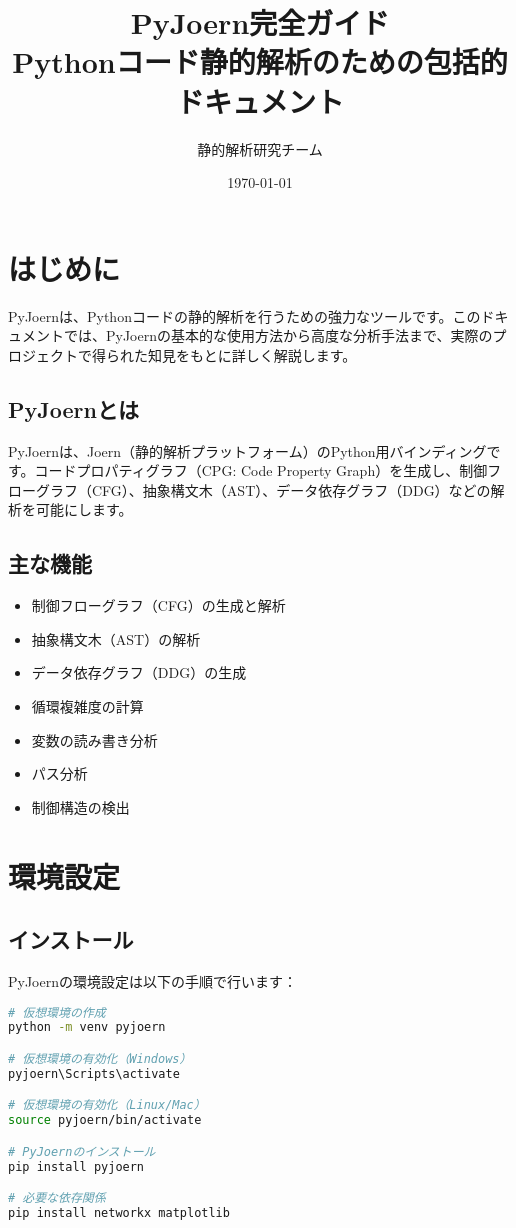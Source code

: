 \documentclass[12pt,a4paper]{article}
\title{\textbf{PyJoern完全ガイド}\\
\large Pythonコード静的解析のための包括的ドキュメント}
\author{静的解析研究チーム}
\date{\today}
\begin{document}
\maketitle
\tableofcontents
\newpage

\section{はじめに}

PyJoernは、Pythonコードの静的解析を行うための強力なツールです。このドキュメントでは、PyJoernの基本的な使用方法から高度な分析手法まで、実際のプロジェクトで得られた知見をもとに詳しく解説します。

\subsection{PyJoernとは}

PyJoernは、Joern（静的解析プラットフォーム）のPython用バインディングです。コードプロパティグラフ（CPG: Code Property Graph）を生成し、制御フローグラフ（CFG）、抽象構文木（AST）、データ依存グラフ（DDG）などの解析を可能にします。

\subsection{主な機能}

\begin{itemize}
    \item 制御フローグラフ（CFG）の生成と解析
    \item 抽象構文木（AST）の解析
    \item データ依存グラフ（DDG）の生成
    \item 循環複雑度の計算
    \item 変数の読み書き分析
    \item パス分析
    \item 制御構造の検出
\end{itemize}

\section{環境設定}

\subsection{インストール}

PyJoernの環境設定は以下の手順で行います：

\begin{lstlisting}[language=bash, caption=仮想環境の作成とPyJoernのインストール]
# 仮想環境の作成
python -m venv pyjoern

# 仮想環境の有効化（Windows）
pyjoern\Scripts\activate

# 仮想環境の有効化（Linux/Mac）
source pyjoern/bin/activate

# PyJoernのインストール
pip install pyjoern

# 必要な依存関係
pip install networkx matplotlib
\end{lstlisting}
\end{document}
